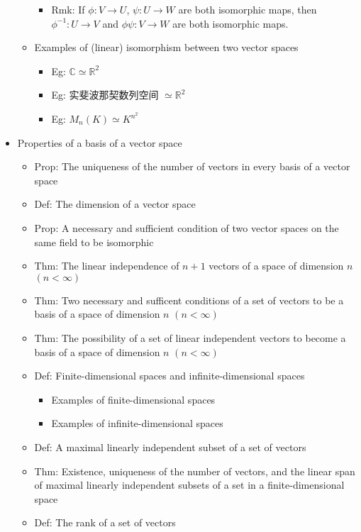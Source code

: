 \documentclass[onecolumn]{ctexart}
\begin{document}
\begin{itemize}
\begin{itemize}
\begin{itemize}
      \item Rmk: If $\phi: V \to U$, $\psi: U \to W$ are both isomorphic maps, then $\phi^{-1}: U \to V$ and $\phi \psi: V \to W$ are both isomorphic maps.
    \end{itemize}
    \item Examples of (linear) isomorphism between two vector spaces
    \begin{itemize}
      \item Eg: $\mathbb{C} \simeq \mathbb{R}^2$
      \item Eg: 实斐波那契数列空间 $\simeq \mathbb{R}^2$
      \item Eg: $M_n(K) \simeq K^{n^2}$
    \end{itemize}
  \end{itemize}
  \item Properties of a basis of a vector space
  \begin{itemize}
    \item Prop: The uniqueness of the number of vectors in every basis of a vector space
    \item Def: The dimension of a vector space
    \item Prop: A necessary and sufficient condition of two vector spaces on the same field to be isomorphic
    \item Thm: The linear independence of $n+1$ vectors of a space of dimension $n$ $(n < \infty)$
    \item Thm: Two necessary and sufficent conditions of a set of vectors to be a basis of a space of dimension $n$ $(n < \infty)$
    \item Thm: The possibility of a set of linear independent vectors to become a basis of a space of dimension $n$ $(n < \infty)$
    \item Def: Finite-dimensional spaces and infinite-dimensional spaces
    \begin{itemize}
      \item Examples of finite-dimensional spaces
      \item Examples of infinite-dimensional spaces
    \end{itemize}
    \item Def: A maximal linearly independent subset of a set of vectors
    \item Thm: Existence, uniqueness of the number of vectors, and the linear span of maximal linearly independent subsets of a set in a finite-dimensional space
    \item Def: The rank of a set of vectors

\end{itemize}
\end{itemize}
\end{document}
